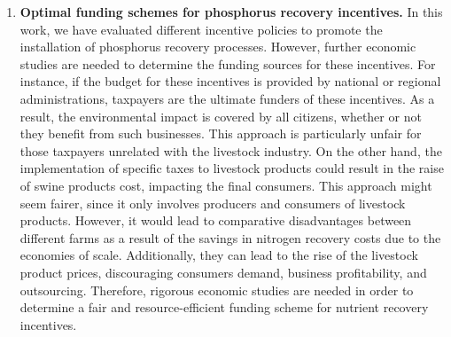 \begin{enumerate}[font=\bfseries]
	\item \textbf{Optimal funding schemes for phosphorus recovery incentives.} In this work, we have evaluated different incentive policies to promote the installation of phosphorus recovery processes. However, further economic studies are needed to determine the funding sources for these incentives. For instance,  if the budget for these incentives is provided by national
	or regional administrations, taxpayers are the ultimate funders of these incentives. As a result, the environmental impact is covered by all citizens, whether or not they benefit from such businesses. This approach is particularly unfair for those taxpayers unrelated with the livestock industry. 
	On the other hand, the implementation of specific taxes to livestock products could result in the raise of swine products cost, impacting the final consumers. This approach might seem fairer, since it only involves producers and consumers of livestock products. However, it would lead to comparative disadvantages between different farms as a
	result of the savings in nitrogen recovery costs due to the economies of scale. Additionally, they can lead to the rise of the livestock product prices, discouraging consumers demand, business profitability, and outsourcing. Therefore, rigorous economic studies are needed in order to determine a fair and resource-efficient funding scheme for nutrient recovery incentives.
	
\end{enumerate}
